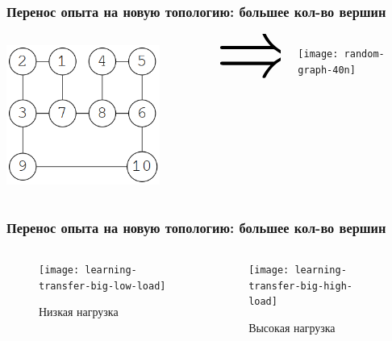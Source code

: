 \documentclass{beamer}
\begin{document}

\begin{frame}
  \frametitle{Перенос опыта на новую топологию: большее кол-во вершин}
  \begin{columns}
    \begin{column}{0.3\textwidth}
      \centerline{\includegraphics[width=0.8\textwidth]{graph-2-1.png}}
    \end{column}
    \begin{column}{0.1\textwidth}
      $\hbox{\fontsize{1in}{1in}\selectfont\(\Rightarrow\)}$
    \end{column}
    \begin{column}{0.6\textwidth}
      \centerline{\texttt{[image: random-graph-40n]}}
    \end{column}
  \end{columns}
\end{frame}


\begin{frame}
  \frametitle{Перенос опыта на новую топологию: большее кол-во вершин}
  \begin{columns}
    \begin{column}{0.5\textwidth}
      \begin{figure}[!h]
        \centerline{\texttt{[image: learning-transfer-big-low-load]}}
        \caption{Низкая нагрузка}
      \end{figure}
    \end{column}
    \begin{column}{0.5\textwidth}
      \begin{figure}
        \centerline{\texttt{[image: learning-transfer-big-high-load]}}
        \caption{Высокая нагрузка}
      \end{figure}
    \end{column}
  \end{columns}
\end{frame}
\end{document}
